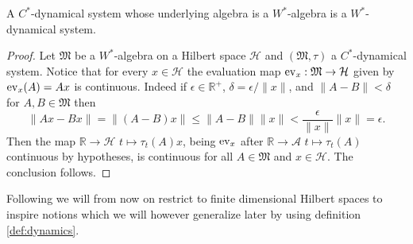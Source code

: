 \begin{theorem}\label{thm:C_W}
A $C^*$-dynamical system whose underlying algebra is a $W^*$-algebra is a $W^*$-dynamical system.
\end{theorem}

\begin{proof}
Let $\mathfrak{M}$ be a $W^*$-algebra on a Hilbert space $\mathcal{H}$ and $(\mathfrak{M},\tau)$ a $C^*$-dynamical system. Notice that for every $x\in\mathcal{H}$ the evaluation map $\operatorname{ev}_{x}:\mathfrak{M}\rightarrow \mathcal{H}$ given by $\operatorname{ev}_{x}(A)=Ax$ is continuous. Indeed if $\epsilon\in\mathbb{R}^+$, $\delta=\epsilon/\|x\|$, and $\|A-B\|<\delta$ for $A,B\in\mathfrak{M}$ then
\begin{equation}
\|Ax-Bx\|=\|(A-B)x\|\leq\|A-B\|\|x\|<\frac{\epsilon}{\|x\|}\|x\|=\epsilon.
\end{equation}
Then the map $\mathbb{R}\rightarrow\mathcal{H}$ $t\mapsto\tau_t(A)x$, being $\operatorname{ev}_{x}$ after $\mathbb{R}\rightarrow\mathcal{A}$ $t\mapsto\tau_t(A)$ continuous by hypotheses, is continuous for all $A\in\mathfrak{M}$ and $x\in\mathcal{H}$. The conclusion follows.
\end{proof}

Following \cite{Duvenhage1999} we will from now on restrict to finite dimensional Hilbert spaces to inspire notions which we will however generalize later by using definition \ref{def:dynamics}.

